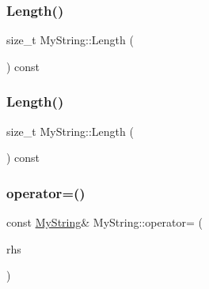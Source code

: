\mbox{\label{class_my_string_a4eb168b1ec401a732b3859abe004d648}} 
\subsubsection{\texorpdfstring{Length()}{Length()}\hspace{0.1cm}{\footnotesize\ttfamily [2/3]}}
{\footnotesize\ttfamily size\+\_\+t My\+String\+::\+Length (\begin{DoxyParamCaption}{ }\end{DoxyParamCaption}) const\hspace{0.3cm}{\ttfamily [inline]}}

\mbox{\label{class_my_string_a4eb168b1ec401a732b3859abe004d648}} 
\subsubsection{\texorpdfstring{Length()}{Length()}\hspace{0.1cm}{\footnotesize\ttfamily [3/3]}}
{\footnotesize\ttfamily size\+\_\+t My\+String\+::\+Length (\begin{DoxyParamCaption}{ }\end{DoxyParamCaption}) const\hspace{0.3cm}{\ttfamily [inline]}}

\mbox{\label{class_my_string_a0156d24764b9d8e4303763750f95cd38}} 
\subsubsection{\texorpdfstring{operator=()}{operator=()}\hspace{0.1cm}{\footnotesize\ttfamily [1/3]}}
{\footnotesize\ttfamily const \mbox{\hyperlink{class_my_string}{My\+String}}\& My\+String\+::operator= (\begin{DoxyParamCaption}\item[{const \mbox{\hyperlink{class_my_string}{My\+String}} \&}]{rhs }\end{DoxyParamCaption})\hspace{0.3cm}{\ttfamily [private]}}

